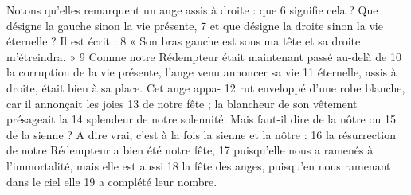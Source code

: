 Notons qu'elles remarquent un ange assis à droite : que	 
6	 	signifie cela ? Que désigne la gauche sinon la vie présente,	 
7	 	et que désigne la droite sinon la vie éternelle ? Il est écrit :	 
8	 	« Son bras gauche est sous ma tête et sa droite m'étreindra. »	 
9	 	Comme notre Rédempteur était maintenant passé au-delà de	 
10	 	la corruption de la vie présente, l'ange venu annoncer sa vie	 
11	 	éternelle, assis à droite, était bien à sa place. Cet ange appa-	 
12	 	rut enveloppé d'une robe blanche, car il annonçait les joies	 
13	 	de notre fête ; la blancheur de son vêtement présageait la	 
14	 	splendeur de notre solennité. Mais faut-il dire de la nôtre ou	 
15	 	de la sienne ? A dire vrai, c'est à la fois la sienne et la nôtre :	 
16	 	la résurrection de notre Rédempteur a bien été notre fête,	 
17	 	puisqu'elle nous a ramenés à l'immortalité, mais elle est aussi	 
18	 	la fête des anges, puisqu'en nous ramenant dans le ciel elle	 
19	 	a complété leur nombre.